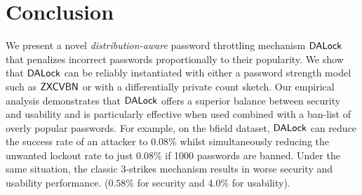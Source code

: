 

\section{Conclusion}
We present a novel {\em distribution-aware} password throttling mechanism $\mathsf{DALock}$ that penalizes incorrect passwords proportionally to their popularity. We show that $\mathsf{DALock}$ can be reliably instantiated with either a password strength model such as $\mathsf{ZXCVBN}$ or with a differentially private count sketch. Our empirical analysis demonstrates that $\mathsf{DALock}$ offers a superior balance between security and usability and is particularly effective when used combined with a ban-list of overly popular passwords. For example, on the bfield dataset, $\mathsf{DALock}$ can reduce the success rate of an attacker to $0.08\%$ whilst simultaneously reducing the unwanted lockout rate to just $0.08\%$ if 1000 passwords are banned. Under the same situation, the classic 3-strikes mechanism results in worse security and usability performance. ($0.58\%$ for security and 4.0\% for usability).

